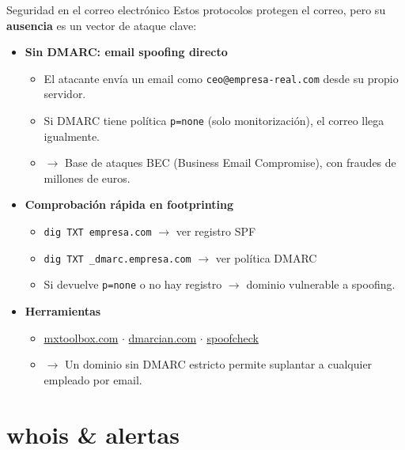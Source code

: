 \documentclass[aspectratio=169,11pt]{beamer}
\begin{document}
\begin{frame}[allowframebreaks]{Seguridad en el correo electrónico}
\small
Estos protocolos protegen el correo, pero su \textbf{ausencia} es un vector de ataque clave:
  \begin{itemize}
  \item \textbf{Sin DMARC: email spoofing directo}
    \begin{itemize}
    \item El atacante envía un email como \texttt{ceo@empresa-real.com} desde su propio servidor.
    \item Si DMARC tiene política \texttt{p=none} (solo monitorización), el correo llega igualmente.
    \item $\rightarrow$ Base de ataques BEC (Business Email Compromise), con fraudes de millones de euros.
    \end{itemize}
  \item \textbf{Comprobación rápida en footprinting}
    \begin{itemize}
    \item \texttt{dig TXT empresa.com} $\rightarrow$ ver registro SPF
    \item \texttt{dig TXT \_dmarc.empresa.com} $\rightarrow$ ver política DMARC
    \item Si devuelve \texttt{p=none} o no hay registro $\rightarrow$ dominio vulnerable a spoofing.
    \end{itemize}
  \item \textbf{Herramientas}
    \begin{itemize}
    \item \href{https://mxtoolbox.com}{mxtoolbox.com} $\cdot$ \href{https://dmarcian.com}{dmarcian.com} $\cdot$ \href{https://github.com/a6avind/spoofcheck}{spoofcheck}
    \item $\rightarrow$ Un dominio sin DMARC estricto permite suplantar a cualquier empleado por email.
    \end{itemize}
  \end{itemize}
\end{frame}

\section{whois \& alertas}
\end{document}
